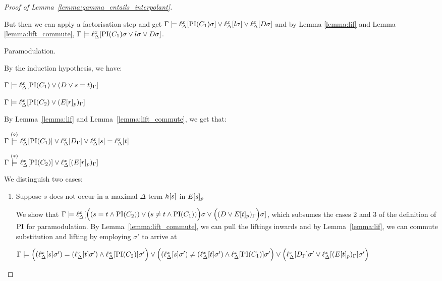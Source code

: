 \begin{proof}[Proof of Lemma~\ref{lemma:gamma_entails_interpolant}]
\begin{description}
			But then we can apply a factorisation step and get
			$\Gamma \models \ell_{\Delta}^{x}[\operatorname{PI}(C_1)\sigma] \lor \ell_{\Delta}^{x}[l\sigma] \lor \ell_{\Delta}^{x}[D\sigma]$ and by Lemma \ref{lemma:lif} and Lemma \ref{lemma:lift_commute}, 
			$\Gamma \entails\nolinebreak \lifdelta{\PI(C_1)\sigma \lor l\sigma \lor D\sigma}$.



		\item{Paramodulation.}
			\begin{prooftree}
			\end{prooftree}
			By the induction hypothesis, we have:

			$\Gamma \models \ell_{\Delta}^{x}[\operatorname{PI}(C_1) \lor (D\lor s=t)_\Gamma]$

			$\Gamma \models \ell_{\Delta}^{x}[\operatorname{PI}(C_2) \lor (E{[r]_{p}})_\Gamma]$

			By Lemma~\ref{lemma:lif} and Lemma~\ref{lemma:lift_commute}, we get that:

			$\Gamma \stackrel{(\circ)}{\models} \ell_{\Delta}^{x}[\operatorname{PI}(C_1)] \lor \ell_{\Delta}^{x}[D_\Gamma] \lor \ell_{\Delta}^{x}[s] = \ell_{\Delta}^{x}[t]$

			$\Gamma \stackrel{(*)}{\models} \ell_{\Delta}^{x}[\operatorname{PI}(C_2)] \lor \ell_{\Delta}^{x}[(E{[r]_{p}})_\Gamma]$
\bigskip
		

	
			We distinguish two cases:\nopagebreak
			\begin{enumerate}
				\item Suppose $s$ does not occur in a maximal $\Delta$-term $h[s]$ in $E{[s]_{p}}$
\label{klehjy}

					We show that $\Gamma \models \ell_{\Delta}^{x}[ \Big((s=t \land \operatorname{PI}(C_2)) \lor (s\neq t \land \operatorname{PI}(C_1))\Big)\sigma \lor \Big((D \lor E{[t]_{p}})_\Gamma\Big)\sigma]$, which subsumes the cases 2 and 3 of the definition of $\operatorname{PI}$ for paramodulation.
					By Lemma~\ref{lemma:lift_commute}, we can pull the liftings inwards and by Lemma~\ref{lemma:lif}, we can commute substitution and lifting by employing $\sigma'$ to arrive at

				$\Gamma \models
				\Big((\ell_{\Delta}^{x}[s]\sigma')=(\ell_{\Delta}^{x}[t]\sigma') \land \ell_{\Delta}^{x}[\operatorname{PI}(C_2)]\sigma'\Big) \lor
				\Big((\ell_{\Delta}^{x}[s]\sigma')\neq(\ell_{\Delta}^{x}[t]\sigma') \land \ell_{\Delta}^{x}[\operatorname{PI}(C_1)]\sigma'\Big) \lor
				\Big(\ell_{\Delta}^{x}[D_\Gamma]\sigma' \lor \ell_{\Delta}^{x}[(E{[t]_{p}})_\Gamma]\sigma'\Big)$


\end{enumerate}
\end{description}
\end{proof}
